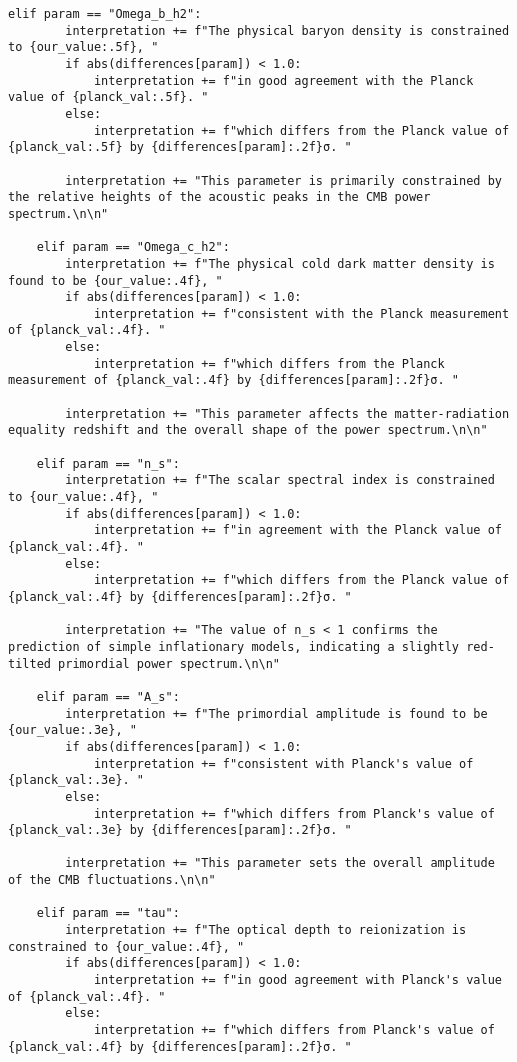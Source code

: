 \documentclass[11pt]{article}
\begin{document}
\begin{enumerate}
\begin{lstlisting}[basicstyle=\small\ttfamily]
    elif param == "Omega_b_h2":
        interpretation += f"The physical baryon density is constrained to {our_value:.5f}, "
        if abs(differences[param]) < 1.0:
            interpretation += f"in good agreement with the Planck value of {planck_val:.5f}. "
        else:
            interpretation += f"which differs from the Planck value of {planck_val:.5f} by {differences[param]:.2f}σ. "
        
        interpretation += "This parameter is primarily constrained by the relative heights of the acoustic peaks in the CMB power spectrum.\n\n"
        
    elif param == "Omega_c_h2":
        interpretation += f"The physical cold dark matter density is found to be {our_value:.4f}, "
        if abs(differences[param]) < 1.0:
            interpretation += f"consistent with the Planck measurement of {planck_val:.4f}. "
        else:
            interpretation += f"which differs from the Planck measurement of {planck_val:.4f} by {differences[param]:.2f}σ. "
        
        interpretation += "This parameter affects the matter-radiation equality redshift and the overall shape of the power spectrum.\n\n"
        
    elif param == "n_s":
        interpretation += f"The scalar spectral index is constrained to {our_value:.4f}, "
        if abs(differences[param]) < 1.0:
            interpretation += f"in agreement with the Planck value of {planck_val:.4f}. "
        else:
            interpretation += f"which differs from the Planck value of {planck_val:.4f} by {differences[param]:.2f}σ. "
        
        interpretation += "The value of n_s < 1 confirms the prediction of simple inflationary models, indicating a slightly red-tilted primordial power spectrum.\n\n"
        
    elif param == "A_s":
        interpretation += f"The primordial amplitude is found to be {our_value:.3e}, "
        if abs(differences[param]) < 1.0:
            interpretation += f"consistent with Planck's value of {planck_val:.3e}. "
        else:
            interpretation += f"which differs from Planck's value of {planck_val:.3e} by {differences[param]:.2f}σ. "
        
        interpretation += "This parameter sets the overall amplitude of the CMB fluctuations.\n\n"
        
    elif param == "tau":
        interpretation += f"The optical depth to reionization is constrained to {our_value:.4f}, "
        if abs(differences[param]) < 1.0:
            interpretation += f"in good agreement with Planck's value of {planck_val:.4f}. "
        else:
            interpretation += f"which differs from Planck's value of {planck_val:.4f} by {differences[param]:.2f}σ. "
        

\end{lstlisting}
\end{enumerate}
\end{document}
